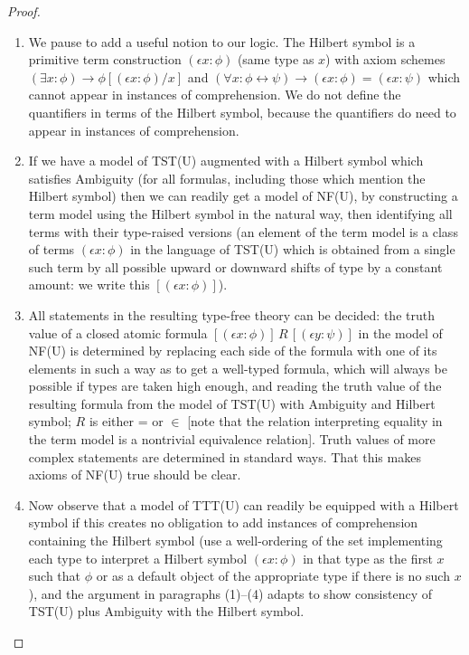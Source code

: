 \documentclass{article}
\theoremstyle{definition}
\theoremstyle{remark}
\begin{document}
{\begin{proof}
\begin{enumerate}
\item We pause to add a useful notion to our logic.  The Hilbert symbol is a primitive term construction $(\epsilon x:\phi)$ (same type as $x$) with axiom schemes $(\exists x:\phi) \rightarrow \phi[(\epsilon x:\phi)/x]$ and $(\forall x:\phi \leftrightarrow \psi) \rightarrow (\epsilon x:\phi) = (\epsilon x:\psi)$ which cannot appear in instances of comprehension. We do not define the quantifiers in terms of the Hilbert symbol, because the quantifiers do need to appear in instances of comprehension.

\item If we have a model of TST(U) augmented with a Hilbert symbol  which satisfies Ambiguity (for all formulas, including those which mention the Hilbert symbol) then we can readily get a model of NF(U), by constructing a term model using the Hilbert symbol in the natural way, then identifying all terms with their type-raised versions (an element of the term model is a class of terms $(\epsilon x:\phi)$ in the language of TST(U) which is obtained from a single such term by all possible upward or downward shifts of type by a constant amount:  we write this
$[(\epsilon x:\phi)]$).

\item All statements in the resulting type-free theory can be decided:  the truth value of a closed atomic formula $[(\epsilon x:\phi)] \,R\, [(\epsilon y:\psi)]$ in the model of NF(U) is determined by replacing each side of the formula with one of its elements in such a way as to get a well-typed formula, which will always be possible if types are taken high enough, and reading the truth value of the resulting formula  from the model of TST(U) with Ambiguity and Hilbert symbol;  $R$ is either = or $\in$ [note that the relation interpreting equality in the term model is a nontrivial equivalence relation].  Truth values of more complex statements are determined in standard ways.  That this makes axioms of NF(U) true should be clear.

\item  Now observe that a model of TTT(U) can readily be equipped with a Hilbert symbol if this creates no obligation to add instances of comprehension
containing the Hilbert symbol (use a well-ordering of the set implementing each type to interpret a Hilbert symbol  $(\epsilon x:\phi)$ in that type as the first $x$ such that $\phi$ or as a default object of the appropriate type if there is no such $x$), and the argument in paragraphs (1)--(4) adapts to show consistency of TST(U) plus Ambiguity with the Hilbert symbol.


\end{enumerate}
\end{proof}}
\end{document}
